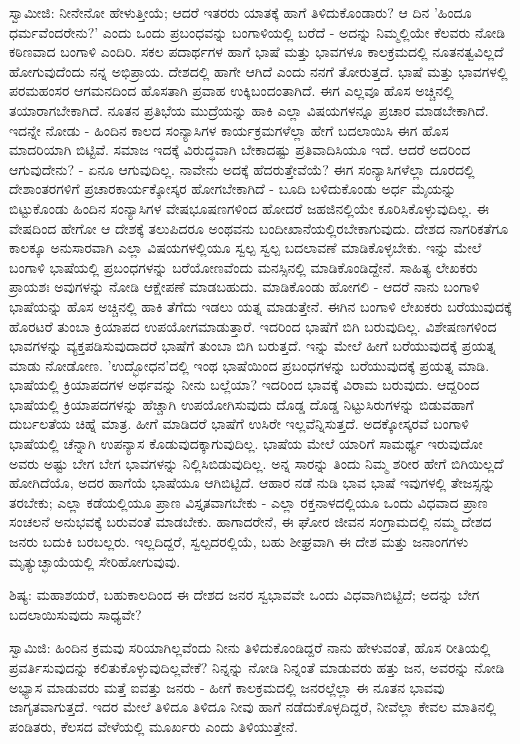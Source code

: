 ಸ್ವಾಮೀಜಿ: ನೀನೇನೋ ಹೇಳುತ್ತೀಯೆ; ಆದರೆ ಇತರರು ಯಾತಕ್ಕೆ ಹಾಗೆ ತಿಳಿದುಕೊಂಡಾರು? ಆ ದಿನ 'ಹಿಂದೂ ಧರ್ಮವೆಂದರೇನು?' ಎಂದು ಒಂದು ಪ್ರಬಂಧವನ್ನು ಬಂಗಾಳಿಯಲ್ಲಿ ಬರೆದೆ - ಅದನ್ನು ನಿಮ್ಮಲ್ಲಿಯೇ ಕೆಲವರು ನೋಡಿ ಕಠಿಣವಾದ ಬಂಗಾಳಿ ಎಂದಿರಿ. ಸಕಲ ಪದಾರ್ಥಗಳ ಹಾಗೆ ಭಾಷೆ ಮತ್ತು ಭಾವಗಳೂ ಕಾಲಕ್ರಮದಲ್ಲಿ ನೂತನತ್ವವಿಲ್ಲದೆ ಹೋಗುವುದೆಂದು ನನ್ನ ಅಭಿಪ್ರಾಯ. ದೇಶದಲ್ಲಿ ಹಾಗೇ ಆಗಿದೆ ಎಂದು ನನಗೆ ತೋರುತ್ತದೆ. ಭಾಷೆ ಮತ್ತು ಭಾವಗಳಲ್ಲಿ ಪರಮಹಂಸರ ಆಗಮನದಿಂದ ಹೊಸತಾಗಿ ಪ್ರವಾಹ ಉಕ್ಕಿಬಂದಂತಾಗಿದೆ. ಈಗ ಎಲ್ಲವೂ ಹೊಸ ಅಚ್ಚಿನಲ್ಲಿ ತಯಾರಾಗಬೇಕಾಗಿದೆ. ನೂತನ ಪ್ರತಿಭೆಯ ಮುದ್ರೆಯನ್ನು ಹಾಕಿ ಎಲ್ಲಾ ವಿಷಯಗಳನ್ನೂ ಪ್ರಚಾರ ಮಾಡಬೇಕಾಗಿದೆ. ಇದನ್ನೇ ನೋಡು - ಹಿಂದಿನ ಕಾಲದ ಸಂನ್ಯಾಸಿಗಳ ಕಾರ್ಯಕ್ರಮಗಳೆಲ್ಲಾ ಹೇಗೆ ಬದಲಾಯಿಸಿ ಈಗ ಹೊಸ ಮಾದರಿಯಾಗಿ ಬಿಟ್ಟಿವೆ. ಸಮಾಜ ಇದಕ್ಕೆ ವಿರುದ್ಧವಾಗಿ ಬೇಕಾದಷ್ಟು ಪ್ರತಿವಾದಿಸಿಯೂ ಇದೆ. ಆದರೆ ಅದರಿಂದ ಆಗುವುದೇನು? - ಏನೂ ಆಗುವುದಿಲ್ಲ. ನಾವೇನು ಅದಕ್ಕೆ ಹೆದರುತ್ತೇವೆಯೆ? ಈಗ ಸಂನ್ಯಾಸಿಗಳೆಲ್ಲಾ ದೂರದಲ್ಲಿ ದೇಶಾಂತರಗಳಿಗೆ ಪ್ರಚಾರಕಾರ್ಯಕ್ಕೋಸ್ಕರ ಹೋಗಬೇಕಾಗಿದೆ - ಬೂದಿ ಬಳಿದುಕೊಂಡು ಅರ್ಧ ಮೈಯನ್ನು ಬಿಟ್ಟುಕೊಂಡು ಹಿಂದಿನ ಸಂನ್ಯಾಸಿಗಳ ವೇಷಭೂಷಣಗಳಿಂದ ಹೋದರೆ ಜಹಜಿನಲ್ಲಿಯೇ ಕೂರಿಸಿಕೊಳ್ಳುವುದಿಲ್ಲ. ಈ ವೇಷದಿಂದ ಹೇಗೋ ಆ ದೇಶಕ್ಕೆ ತಲುಪಿದರೂ ಅಂಥವನು ಬಂದೀಖಾನೆಯಲ್ಲಿರಬೇಕಾಗುವುದು. ದೇಶದ ನಾಗರಿಕತೆಗೂ ಕಾಲಕ್ಕೂ ಅನುಸಾರವಾಗಿ ಎಲ್ಲಾ ವಿಷಯಗಳಲ್ಲಿಯೂ ಸ್ವಲ್ಪ ಸ್ವಲ್ಪ ಬದಲಾವಣೆ ಮಾಡಿಕೊಳ್ಳಬೇಕು. ಇನ್ನು ಮೇಲೆ ಬಂಗಾಳಿ ಭಾಷೆಯಲ್ಲಿ ಪ್ರಬಂಧಗಳನ್ನು ಬರೆಯೋಣವೆಂದು ಮನಸ್ಸಿನಲ್ಲಿ ಮಾಡಿಕೊಂಡಿದ್ದೇನೆ. ಸಾಹಿತ್ಯ ಲೇಖಕರು ಪ್ರಾಯಶಃ ಅವುಗಳನ್ನು ನೋಡಿ ಆಕ್ಷೇಪಣೆ ಮಾಡಬಹುದು. ಮಾಡಿಕೊಂಡು ಹೋಗಲಿ - ಆದರೆ ನಾನು ಬಂಗಾಳಿ ಭಾಷೆಯನ್ನು ಹೊಸ ಅಚ್ಚಿನಲ್ಲಿ ಹಾಕಿ ತೆಗೆದು ಇಡಲು ಯತ್ನ ಮಾಡುತ್ತೇನೆ. ಈಗಿನ ಬಂಗಾಳಿ ಲೇಖಕರು ಬರೆಯುವುದಕ್ಕೆ ಹೊರಟರೆ ತುಂಬಾ ಕ್ರಿಯಾಪದ ಉಪಯೋಗಮಾಡುತ್ತಾರೆ. ಇದರಿಂದ ಭಾಷೆಗೆ ಬಿಗಿ ಬರುವುದಿಲ್ಲ. ವಿಶೇಷಣಗಳಿಂದ ಭಾವಗಳನ್ನು ವ್ಯಕ್ತಪಡಿಸುವುದಾದರೆ ಭಾಷೆಗೆ ತುಂಬಾ ಬಿಗಿ ಬರುತ್ತದೆ. ಇನ್ನು ಮೇಲೆ ಹೀಗೆ ಬರೆಯುವುದಕ್ಕೆ ಪ್ರಯತ್ನ ಮಾಡು ನೋಡೋಣ. 'ಉದ್ಭೋಧನ'ದಲ್ಲಿ ಇಂಥ ಭಾಷೆಯಿಂದ ಪ್ರಬಂಧಗಳನ್ನು ಬರೆಯುವುದಕ್ಕೆ ಪ್ರಯತ್ನ ಮಾಡಿ. ಭಾಷೆಯಲ್ಲಿ ಕ್ರಿಯಾಪದಗಳ ಅರ್ಥವನ್ನು ನೀನು ಬಲ್ಲೆಯಾ? ಇದರಿಂದ ಭಾವಕ್ಕೆ ವಿರಾಮ ಬರುವುದು. ಆದ್ದರಿಂದ ಭಾಷೆಯಲ್ಲಿ ಕ್ರಿಯಾಪದಗಳನ್ನು ಹೆಚ್ಚಾಗಿ ಉಪಯೋಗಿಸುವುದು ದೊಡ್ಡ ದೊಡ್ಡ ನಿಟ್ಟುಸಿರುಗಳನ್ನು ಬಿಡುವಹಾಗೆ ದುರ್ಬಲತೆಯ ಚಿಹ್ನೆ ಮಾತ್ರ. ಹೀಗೆ ಮಾಡಿದರೆ ಭಾಷೆಗೆ ಉಸಿರೇ ಇಲ್ಲವೆನ್ನಿಸುತ್ತದೆ. ಅದಕ್ಕೋಸ್ಕರವೆ ಬಂಗಾಳಿ ಭಾಷೆಯಲ್ಲಿ ಚೆನ್ನಾಗಿ ಉಪನ್ಯಾಸ ಕೊಡುವುದಕ್ಕಾಗುವುದಿಲ್ಲ. ಭಾಷೆಯ ಮೇಲೆ ಯಾರಿಗೆ ಸಾಮರ್ಥ್ಯ ಇರುವುದೋ ಅವರು ಅಷ್ಟು ಬೇಗ ಬೇಗ ಭಾವಗಳನ್ನು ನಿಲ್ಲಿಸಿಬಿಡುವುದಿಲ್ಲ. ಅನ್ನ ಸಾರನ್ನು ತಿಂದು ನಿಮ್ಮ ಶರೀರ ಹೇಗೆ ಬಿಗಿಯಿಲ್ಲದೆ ಹೋಗಿದೆಯೊ, ಅದರ ಹಾಗೆಯೆ ಭಾಷೆಯೂ ಆಗಿಬಿಟ್ಟಿದೆ. ಆಹಾರ ನಡೆ ನುಡಿ ಭಾವ ಭಾಷೆ ಇವುಗಳಲ್ಲಿ ತೇಜಸ್ಸನ್ನು ತರಬೇಕು; ಎಲ್ಲಾ ಕಡೆಯಲ್ಲಿಯೂ ಪ್ರಾಣ ವಿಸ್ತೃತವಾಗಬೇಕು - ಎಲ್ಲಾ ರಕ್ತನಾಳದಲ್ಲಿಯೂ ಒಂದು ವಿಧವಾದ ಪ್ರಾಣ ಸಂಚಲನೆ ಅನುಭವಕ್ಕೆ ಬರುವಂತೆ ಮಾಡಬೇಕು. ಹಾಗಾದರೇನೆ, ಈ ಘೋರ ಜೀವನ ಸಂಗ್ರಾಮದಲ್ಲಿ ನಮ್ಮ ದೇಶದ ಜನರು ಬದುಕಿ ಬರಬಲ್ಲರು. ಇಲ್ಲದಿದ್ದರೆ, ಸ್ವಲ್ಪದರಲ್ಲಿಯೆ, ಬಹು ಶೀಘ್ರವಾಗಿ ಈ ದೇಶ ಮತ್ತು ಜನಾಂಗಗಳು ಮೃತ್ಯುಚ್ಛಾಯೆಯಲ್ಲಿ ಸೇರಿಹೋಗುವುವು.

ಶಿಷ್ಯ: ಮಹಾಶಯರೆ, ಬಹುಕಾಲದಿಂದ ಈ ದೇಶದ ಜನರ ಸ್ವಭಾವವೇ ಒಂದು ವಿಧವಾಗಿಬಿಟ್ಟಿದೆ; ಅದನ್ನು ಬೇಗ ಬದಲಾಯಿಸುವುದು ಸಾಧ್ಯವೇ?

ಸ್ವಾಮಿಜಿ: ಹಿಂದಿನ ಕ್ರಮವು ಸರಿಯಾಗಿಲ್ಲವೆಂದು ನೀನು ತಿಳಿದುಕೊಂಡಿದ್ದರೆ ನಾನು ಹೇಳುವಂತೆ, ಹೊಸ ರೀತಿಯಲ್ಲಿ ಪ್ರವರ್ತಿಸುವುದನ್ನು ಕಲಿತುಕೊಳ್ಳುವುದಿಲ್ಲವೇಕೆ? ನಿನ್ನನ್ನು ನೋಡಿ ನಿನ್ನಂತೆ ಮಾಡುವರು ಹತ್ತು ಜನ, ಅವರನ್ನು ನೋಡಿ ಅಭ್ಯಾಸ ಮಾಡುವರು ಮತ್ತೆ ಐವತ್ತು ಜನರು - ಹೀಗೆ ಕಾಲಕ್ರಮದಲ್ಲಿ ಜನರಲ್ಲೆಲ್ಲಾ ಈ ನೂತನ ಭಾವವು ಜಾಗೃತವಾಗುತ್ತದೆ. ಇದರ ಮೇಲೆ ತಿಳಿದೂ ತಿಳಿದೂ ನೀವು ಹಾಗೆ ನಡೆದುಕೊಳ್ಳದಿದ್ದರೆ, ನೀವೆಲ್ಲಾ ಕೇವಲ ಮಾತಿನಲ್ಲಿ ಪಂಡಿತರು, ಕೆಲಸದ ವೇಳೆಯಲ್ಲಿ ಮೂರ್ಖರು ಎಂದು ತಿಳಿಯುತ್ತೇನೆ.

